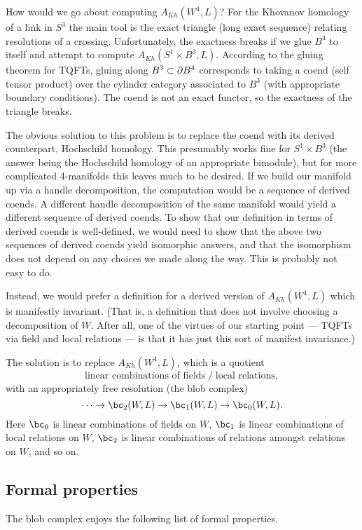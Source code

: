 How would we go about computing $A_{Kh}(W^4, L)$?
For the Khovanov homology of a link in $S^3$ the main tool is the exact triangle (long exact sequence)
relating resolutions of a crossing.
Unfortunately, the exactness breaks if we glue $B^4$ to itself and attempt
to compute $A_{Kh}(S^1\times B^3, L)$.
According to the gluing theorem for TQFTs, gluing along $B^3 \subset \partial B^4$
corresponds to taking a coend (self tensor product) over the cylinder category
associated to $B^3$ (with appropriate boundary conditions).
The coend is not an exact functor, so the exactness of the triangle breaks.

The obvious solution to this problem is to replace the coend with its derived counterpart, 
Hochschild homology.
This presumably works fine for $S^1\times B^3$ (the answer being the Hochschild homology
of an appropriate bimodule), but for more complicated 4-manifolds this leaves much to be desired.
If we build our manifold up via a handle decomposition, the computation
would be a sequence of derived coends.
A different handle decomposition of the same manifold would yield a different
sequence of derived coends.
To show that our definition in terms of derived coends is well-defined, we
would need to show that the above two sequences of derived coends yield 
isomorphic answers, and that the isomorphism does not depend on any
choices we made along the way.
This is probably not easy to do.

Instead, we would prefer a definition for a derived version of $A_{Kh}(W^4, L)$
which is manifestly invariant.
(That is, a definition that does not
involve choosing a decomposition of $W$.
After all, one of the virtues of our starting point --- TQFTs via field and local relations ---
is that it has just this sort of manifest invariance.)

The solution is to replace $A_{Kh}(W^4, L)$, which is a quotient
\[
 \text{linear combinations of fields} \;\big/\; \text{local relations} ,
\]
with an appropriately free resolution (the blob complex)
\[
	\cdots\to \bc_2(W, L) \to \bc_1(W, L) \to \bc_0(W, L) .
\]
Here $\bc_0$ is linear combinations of fields on $W$,
$\bc_1$ is linear combinations of local relations on $W$,
$\bc_2$ is linear combinations of relations amongst relations on $W$,
and so on.


\subsection{Formal properties}
\label{sec:properties}
The blob complex enjoys the following list of formal properties.

